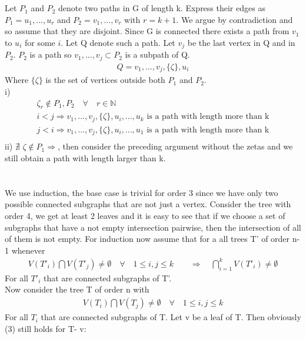 \documentclass{article}
\begin{document}
	\section{}
	
	Let $P_1$ and $P_2$ denote two paths in G of length k. Express their edges as $P_1 = {u_1,...,u_r}$ and $P_2 = v_1,...,v_r$ with $r= k+1$. We argue by contradiction and so assume that they are disjoint. Since G is connected there exists a path from $v_1$ to $u_i$ for some $i$. Let Q denote such a path. Let $v_j$ be the last vertex in Q and in $P_2$. $P_2$ is a path so $v_1,...,v_j \subset P_2$ is a subpath of Q. 
	\begin{align*}
		Q = v_1,...,v_j,\{\zeta\},u_i 
	\end{align*}
	Where $\{\zeta\}$ is the set of vertices outside both $P_1$ and $P_2$. \\
	i) \begin{align*}
		\zeta_r \notin P_1,P_2 \quad \forall \quad r\in \mathbb{N}\\
		i<j \Rightarrow v_1,...,v_j,\{\zeta\},u_i,...,u_k \text{ is a path with length more than k}\\
		j<i \Rightarrow v_1,...,v_j,\{\zeta\},u_i,...,u_1 \text{ is a path with length more than k}\\
	\end{align*}
	ii) $\nexists$ $\zeta \notin P_1 \Rightarrow$, then consider the preceding argument without the zetas and we still obtain a path with length larger than k. 
	
	\clearpage
	
	
	\section{}
	
	We use induction, the base case is trivial for order 3 since we have only two possible connected subgraphs that are not just a vertex. Consider the tree with order 4, we get at least 2 leaves and it is easy to see that if we choose a set of subgraphs that have a not empty intersection pairwise, then the intersection of all of them is not empty.
	For induction  now assume that for a all trees T' of order n-1 whenever
	\begin{align}
		V(T'_i) \bigcap V(T'_j) \neq \emptyset \quad \forall \quad  1 \leq i,j \leq k \qquad \Rightarrow \quad  \bigcap_{i=1}^{k}V(T'_i)\neq \emptyset
	\end{align}
	For all $T'_i$ that are connected subgraphs of T'. \\
	Now consider the tree T of order n with 
	\begin{align}
		V(T_i) \bigcap V(T_j) \neq \emptyset \quad \forall \quad  1 \leq i,j \leq k
	\end{align}
	For all $T_i$ that are connected subgraphs of T. 
	Let v be a leaf of T. Then obviously (3) still holds for T- v:
	
\end{document}

